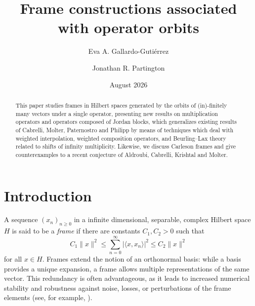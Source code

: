 \documentclass[11pt]{amsart}
\title{Frame constructions associated with operator orbits}
\author{Eva A. Gallardo-Guti\'{e}rrez}
\author{Jonathan R. Partington}
\date{August 2026}
\theoremstyle{definition}
\theoremstyle{remark}
\numberwithin{equation}{section}
\begin{document}
\begin{abstract}
This paper studies frames in Hilbert spaces generated by the orbits of (in)-finitely many vectors under a single operator, presenting new results on multiplication operators and operators composed of Jordan blocks, which generalizes existing results of Cabrelli, Molter, Paternostro and Philipp  by means of techniques which deal with weighted interpolation, weighted composition operators, and Beurling--Lax theory related to shifts of infinity multiplicity.
Likewise, we discuss Carleson frames and give counterexamples to a recent conjecture of Aldroubi, Cabrelli, Krishtal and Molter.


\end{abstract}

\maketitle


\section{Introduction}
A sequence $(x_n)_{n \ge 0}$  in a infinite dimensional, separable, complex Hilbert space $H$ is said to be a {\em frame\/} if
there are constants $C_1,C_2 > 0$ such that
\[
C_1 \|x\|^2 \le \sum_{n=0}^\infty |\langle x,x_n\rangle|^2 \le C_2 \|x\|^2
\]
for all $x \in H$.
Frames extend the notion of an orthonormal basis: while a basis provides a unique expansion, a frame allows multiple representations of the same vector. This redundancy is often advantageous, as it leads to increased numerical stability and robustness against noise, losses, or perturbations of the frame elements (see, for example, \cite{meyer}).

\smallskip
\end{document}
